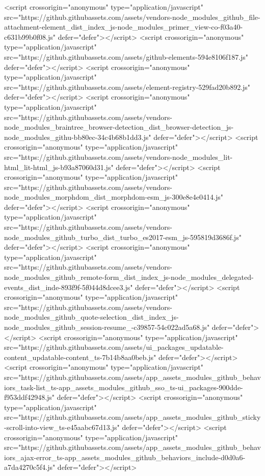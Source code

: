 <script crossorigin="anonymous" type="application/javascript" src="https://github.githubassets.com/assets/vendors-node_modules_github_file-attachment-element_dist_index_js-node_modules_primer_view-co-f03a40-c631b99b0f08.js" defer="defer"></script>
<script crossorigin="anonymous" type="application/javascript" src="https://github.githubassets.com/assets/github-elements-594e8106f187.js" defer="defer"></script>
<script crossorigin="anonymous" type="application/javascript" src="https://github.githubassets.com/assets/element-registry-529fad20b892.js" defer="defer"></script>
<script crossorigin="anonymous" type="application/javascript" src="https://github.githubassets.com/assets/vendors-node_modules_braintree_browser-detection_dist_browser-detection_js-node_modules_githu-bb80ec-34c4b68b1dd3.js" defer="defer"></script>
<script crossorigin="anonymous" type="application/javascript" src="https://github.githubassets.com/assets/vendors-node_modules_lit-html_lit-html_js-b93a87060d31.js" defer="defer"></script>
<script crossorigin="anonymous" type="application/javascript" src="https://github.githubassets.com/assets/vendors-node_modules_morphdom_dist_morphdom-esm_js-300e8e4e0414.js" defer="defer"></script>
<script crossorigin="anonymous" type="application/javascript" src="https://github.githubassets.com/assets/vendors-node_modules_github_turbo_dist_turbo_es2017-esm_js-595819d3686f.js" defer="defer"></script>
<script crossorigin="anonymous" type="application/javascript" src="https://github.githubassets.com/assets/vendors-node_modules_github_remote-form_dist_index_js-node_modules_delegated-events_dist_inde-893f9f-5f044d8dcee3.js" defer="defer"></script>
<script crossorigin="anonymous" type="application/javascript" src="https://github.githubassets.com/assets/vendors-node_modules_github_quote-selection_dist_index_js-node_modules_github_session-resume_-c39857-54c022ad5a68.js" defer="defer"></script>
<script crossorigin="anonymous" type="application/javascript" src="https://github.githubassets.com/assets/ui_packages_updatable-content_updatable-content_ts-7b14b8aa0beb.js" defer="defer"></script>
<script crossorigin="anonymous" type="application/javascript" src="https://github.githubassets.com/assets/app_assets_modules_github_behaviors_task-list_ts-app_assets_modules_github_sso_ts-ui_packages-900dde-f953ddf42948.js" defer="defer"></script>
<script crossorigin="anonymous" type="application/javascript" src="https://github.githubassets.com/assets/app_assets_modules_github_sticky-scroll-into-view_ts-e45aabc67d13.js" defer="defer"></script>
<script crossorigin="anonymous" type="application/javascript" src="https://github.githubassets.com/assets/app_assets_modules_github_behaviors_ajax-error_ts-app_assets_modules_github_behaviors_include-d0d0a6-a7da4270c5f4.js" defer="defer"></script>
